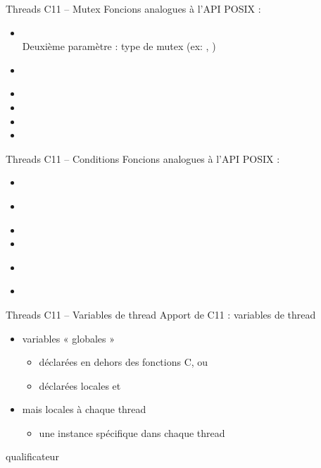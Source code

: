 \begin {frame} {Threads C11 -- Mutex}
    Foncions analogues à l'API POSIX :

    {\fC
    \begin {itemize}
	\item {} \\
	    Deuxième paramètre : type de mutex (ex: ,
	    )
	\item {} \\
	\item {}
	\item {}
	\item {}
	\item {}
    \end {itemize}
    }

\end {frame}


\begin {frame} {Threads C11 -- Conditions}
    Foncions analogues à l'API POSIX :

    {\fC
    \begin {itemize}
	\item {} \\
	\item {} \\
	\item {}
	\item {}
	\item {} \\
	\item {} \\
    \end {itemize}
    }

\end {frame}


\begin {frame} {Threads C11 -- Variables de thread}
    Apport de C11 : variables de thread

    \begin {itemize}
	\item variables « globales »
	    \begin {itemize}
		\item déclarées en dehors des fonctions C, ou
		\item déclarées locales et 
	    \end {itemize}
	\item mais locales à chaque thread
	    \begin {itemize}
		\item une instance spécifique dans chaque thread
	    \end {itemize}
    \end {itemize}

    \implique qualificateur 
\end {frame}

